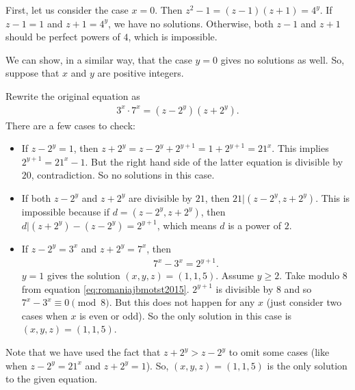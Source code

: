 \documentclass{subfile}
\begin{document}
				\begin{solution}
					First, let us consider the case $x=0$. Then $z^2-1 =(z-1)(z+1)=4^y$. If $z-1=1$ and $z+1=4^y$, we have no solutions. Otherwise, both $z-1$ and $z+1$ should be perfect powers of $4$, which is impossible.
					
					We can show, in a similar way, that the case $y=0$ gives no solutions as well. So, suppose that $x$ and $y$ are positive integers.
					
					Rewrite the original equation as
						\begin{align*}
							3^x \cdot 7^x = (z-2^y)(z+2^y).
						\end{align*}
					There are a few cases to check:
						\begin{itemize}
							\item If $z-2^y=1$, then $z+2^y = z-2^y+2^{y+1}=1+2^{y+1}=21^x$. This implies $2^{y+1}=21^x-1$. But the right hand side of the latter equation is divisible by $20$, contradiction. So no solutions in this case.
							
							\item If both $z-2^y$ and $z+2^y$ are divisible by $21$, then $21|(z-2^y, z+2^y)$. This is impossible because if $d=(z-2^y, z+2^y)$, then $d|(z+2^y) -(z-2^y)=2^{y+1}$, which means $d$ is a power of $2$.
							
							\item If $z-2^y=3^x$ and $z+2^y=7^x$, then 
								\begin{align}\label{eq:romaniajbmotst2015}
									7^x-3^x=2^{y+1}.
								\end{align}
							 $y=1$ gives the solution $(x,y,z)=(1,1,5)$. Assume $y \geq 2$. Take modulo $8$ from equation \eqref{eq:romaniajbmotst2015}. $2^{y+1}$ is divisible by $8$ and so $7^x-3^x \equiv 0 \pmod 8$. But this does not happen for any $x$ (just consider two cases when $x$ is even or odd). So the only solution in this case is $(x,y,z)=(1,1,5)$.
						\end{itemize}
					Note that we have used the fact that $z+2^y > z-2^y$ to omit some cases (like when $z-2^y=21^x$ and $z+2^y = 1$). So, $(x,y,z)=(1,1,5)$ is the only solution to the given equation.
				\end{solution}
			
\end{document}
